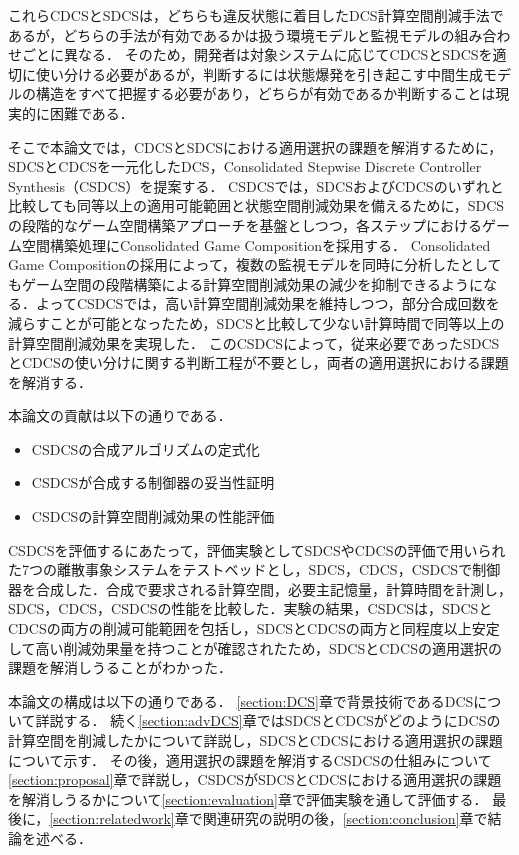これらCDCSとSDCSは，どちらも違反状態に着目したDCS計算空間削減手法であるが，どちらの手法が有効であるかは扱う環境モデルと監視モデルの組み合わせごとに異なる．
そのため，開発者は対象システムに応じてCDCSとSDCSを適切に使い分ける必要があるが，判断するには状態爆発を引き起こす中間生成モデルの構造をすべて把握する必要があり，どちらが有効であるか判断することは現実的に困難である．

そこで本論文では，CDCSとSDCSにおける適用選択の課題を解消するために，SDCSとCDCSを一元化したDCS，Consolidated Stepwise Discrete Controller Synthesis（CSDCS）を提案する．
CSDCSでは，SDCSおよびCDCSのいずれと比較しても同等以上の適用可能範囲と状態空間削減効果を備えるために，SDCSの段階的なゲーム空間構築アプローチを基盤としつつ，各ステップにおけるゲーム空間構築処理にConsolidated Game Compositionを採用する．
Consolidated Game Compositionの採用によって，複数の監視モデルを同時に分析したとしてもゲーム空間の段階構築による計算空間削減効果の減少を抑制できるようになる．よってCSDCSでは，高い計算空間削減効果を維持しつつ，部分合成回数を減らすことが可能となったため，SDCSと比較して少ない計算時間で同等以上の計算空間削減効果を実現した．
このCSDCSによって，従来必要であったSDCSとCDCSの使い分けに関する判断工程が不要とし，両者の適用選択における課題を解消する．

本論文の貢献は以下の通りである．
\begin{itemize}
	\item CSDCSの合成アルゴリズムの定式化
	\item CSDCSが合成する制御器の妥当性証明
	\item CSDCSの計算空間削減効果の性能評価
\end{itemize}
CSDCSを評価するにあたって，評価実験としてSDCSやCDCSの評価で用いられた7つの離散事象システムをテストベッドとし，SDCS，CDCS，CSDCSで制御器を合成した．合成で要求される計算空間，必要主記憶量，計算時間を計測し，SDCS，CDCS，CSDCSの性能を比較した．実験の結果，CSDCSは，SDCSとCDCSの両方の削減可能範囲を包括し，SDCSとCDCSの両方と同程度以上安定して高い削減効果量を持つことが確認されたため，SDCSとCDCSの適用選択の課題を解消しうることがわかった．

本論文の構成は以下の通りである．
\ref{section:DCS}章で背景技術であるDCSについて詳説する．
続く\ref{section:advDCS}章ではSDCSとCDCSがどのようにDCSの計算空間を削減したかについて詳説し，SDCSとCDCSにおける適用選択の課題について示す．
その後，適用選択の課題を解消するCSDCSの仕組みについて\ref{section:proposal}章で詳説し，CSDCSがSDCSとCDCSにおける適用選択の課題を解消しうるかについて\ref{section:evaluation}章で評価実験を通して評価する．
最後に，\ref{section:relatedwork}章で関連研究の説明の後，\ref{section:conclusion}章で結論を述べる．